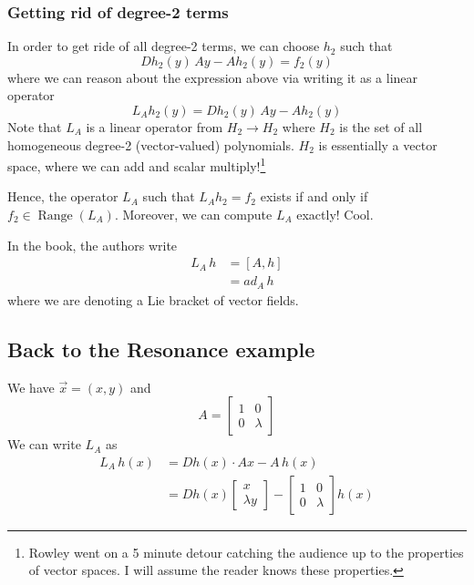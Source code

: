 \documentclass{article}
\begin{document}
\subsubsection{Getting rid of degree-2 terms}

In order to get ride of all degree-2 terms, we can choose $h_2$ such that 
\[
Dh_2(y)\, Ay-Ah_2(y)=f_2(y)
\]
where we can reason about the expression above via writing it as a linear operator
\[
L_A h_2(y)=Dh_2(y)\, Ay - A h_2(y)
\]
Note that $L_A$ is a linear operator from $H_2\to H_2$ where $H_2$ is the set of all homogeneous degree-2 (vector-valued) polynomials. $H_2$ is essentially a vector space, where we can add and scalar multiply!\footnote{Rowley went on a 5 minute detour catching the audience up to the properties of vector spaces. I will assume the reader knows these properties.}

Hence, the operator $L_A$ such that $L_A h_2=f_2$ exists if and only if $f_2\in\operatorname{Range}(L_A)$. Moreover, we can compute $L_A$ exactly! Cool.

In the book, the authors write
\begin{align*}
    L_A\, h &= \left[A, h\right]\\
    &= ad_A\, h
\end{align*}
where we are denoting a Lie bracket of vector fields.

\subsection{Back to the Resonance example}

We have $\vec{x}=(x,y)$ and 
\[
A=\begin{bmatrix}
    1 & 0 \\ 0 & \lambda
\end{bmatrix}
\]
We can write $L_A$ as 
\begin{align*}
    L_A\, h(x)&=Dh(x)\cdot Ax - A\, h(x)\\
    &=Dh(x)\begin{bmatrix}
        x\\\lambda y
    \end{bmatrix}-\begin{bmatrix}
    1 & 0 \\ 0 & \lambda
\end{bmatrix} h(x)
\end{align*}
\end{document}
